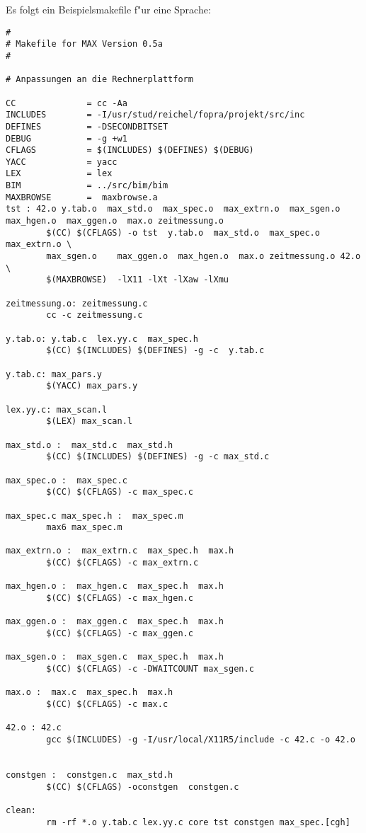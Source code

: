Es folgt ein Beispielsmakefile f"ur eine Sprache:
\begin{verbatim}
#
# Makefile for MAX Version 0.5a
#

# Anpassungen an die Rechnerplattform

CC              = cc -Aa
INCLUDES        = -I/usr/stud/reichel/fopra/projekt/src/inc
DEFINES         = -DSECONDBITSET
DEBUG           = -g +w1
CFLAGS          = $(INCLUDES) $(DEFINES) $(DEBUG) 
YACC            = yacc
LEX             = lex 
BIM             = ../src/bim/bim
MAXBROWSE       =  maxbrowse.a
tst : 42.o y.tab.o  max_std.o  max_spec.o  max_extrn.o  max_sgen.o  max_hgen.o  max_ggen.o  max.o zeitmessung.o
        $(CC) $(CFLAGS) -o tst  y.tab.o  max_std.o  max_spec.o  max_extrn.o \
        max_sgen.o    max_ggen.o  max_hgen.o  max.o zeitmessung.o 42.o \
        $(MAXBROWSE)  -lX11 -lXt -lXaw -lXmu

zeitmessung.o: zeitmessung.c
        cc -c zeitmessung.c

y.tab.o: y.tab.c  lex.yy.c  max_spec.h
        $(CC) $(INCLUDES) $(DEFINES) -g -c  y.tab.c

y.tab.c: max_pars.y 
        $(YACC) max_pars.y

lex.yy.c: max_scan.l 
        $(LEX) max_scan.l 

max_std.o :  max_std.c  max_std.h
        $(CC) $(INCLUDES) $(DEFINES) -g -c max_std.c

max_spec.o :  max_spec.c
        $(CC) $(CFLAGS) -c max_spec.c

max_spec.c max_spec.h :  max_spec.m
        max6 max_spec.m

max_extrn.o :  max_extrn.c  max_spec.h  max.h
        $(CC) $(CFLAGS) -c max_extrn.c

max_hgen.o :  max_hgen.c  max_spec.h  max.h
        $(CC) $(CFLAGS) -c max_hgen.c

max_ggen.o :  max_ggen.c  max_spec.h  max.h
        $(CC) $(CFLAGS) -c max_ggen.c

max_sgen.o :  max_sgen.c  max_spec.h  max.h
        $(CC) $(CFLAGS) -c -DWAITCOUNT max_sgen.c

max.o :  max.c  max_spec.h  max.h
        $(CC) $(CFLAGS) -c max.c

42.o : 42.c
        gcc $(INCLUDES) -g -I/usr/local/X11R5/include -c 42.c -o 42.o


constgen :  constgen.c  max_std.h
        $(CC) $(CFLAGS) -oconstgen  constgen.c
 
clean:
        rm -rf *.o y.tab.c lex.yy.c core tst constgen max_spec.[cgh]


\end{verbatim}


